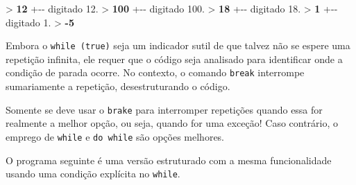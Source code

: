 \documentclass[
  11pt,
  a4paper,
]{scrbook}
\newenvironment{Shaded}{\begin{snugshade}}{\end{snugshade}}
\newcommand{\KeywordTok}[1]{\textcolor[rgb]{0.13,0.29,0.53}{\textbf{#1}}}
\newcommand{\NormalTok}[1]{#1}
\begin{document}
\begin{Shaded}
\begin{Highlighting}[]
\NormalTok{\textgreater{} }\KeywordTok{ 12 }
\NormalTok{  +{-}{-} digitado 12.}
\NormalTok{\textgreater{} }\KeywordTok{ 100 }
\NormalTok{  +{-}{-} digitado 100.}
\NormalTok{\textgreater{} }\KeywordTok{ 18 }
\NormalTok{  +{-}{-} digitado 18.}
\NormalTok{\textgreater{} }\KeywordTok{ 1 }
\NormalTok{  +{-}{-} digitado 1.}
\NormalTok{\textgreater{} }\KeywordTok{ {-}5 }
\end{Highlighting}
\end{Shaded}

Embora o \texttt{while\ (true)} seja um indicador sutil de que talvez
não se espere uma repetição infinita, ele requer que o código seja
analisado para identificar onde a condição de parada ocorre. No
contexto, o comando \texttt{break} interrompe sumariamente a repetição,
desestruturando o código.

\begin{tcolorbox}[enhanced jigsaw, arc=.35mm, bottomtitle=1mm, colbacktitle=quarto-callout-tip-color!10!white, title=\textcolor{quarto-callout-tip-color}{\faLightbulb}\hspace{0.5em}{Dica}, toprule=.15mm, left=2mm, opacityback=0, colback=white, colframe=quarto-callout-tip-color-frame, opacitybacktitle=0.6, bottomrule=.15mm, leftrule=.75mm, toptitle=1mm, coltitle=black, titlerule=0mm, rightrule=.15mm, breakable]

Somente se deve usar o \texttt{brake} para interromper repetições quando
essa for realmente a melhor opção, ou seja, quando for uma exceção! Caso
contrário, o emprego de \texttt{while} e \texttt{do\ while} são opções
melhores.

\end{tcolorbox}

O programa seguinte é uma versão estruturado com a mesma funcionalidade
usando uma condição explícita no \texttt{while}.
\end{document}
